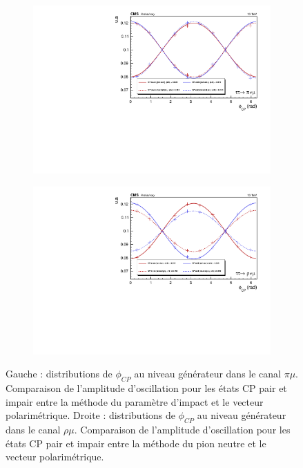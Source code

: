 \begin{figure}
  \begin{subfigure}[b]{0.5\linewidth}
    \centering
    \includegraphics[width=\linewidth]{Chapitre6/Images/PIMU/pimu_pvdpgen.pdf} 
    \caption*{} 
    \vspace{0.5ex}
  \end{subfigure}%
  \begin{subfigure}[b]{0.5\linewidth}
    \centering
    \includegraphics[width=\linewidth]{Chapitre6/Images/RHOMU/rhomu_pvdpgen.pdf} 
    \caption*{} 
    \vspace{0.5ex}
  \end{subfigure} 
\caption{Gauche : distributions de $\phi_{CP}$ au niveau générateur dans le canal $\pi\mu$. Comparaison de l'amplitude d'oscillation pour les états CP pair et impair entre la méthode du paramètre d'impact et le vecteur polarimétrique. Droite : distributions de $\phi_{CP}$ au niveau générateur dans le canal $\rho\mu$. Comparaison de l'amplitude d'oscillation pour les états CP pair et impair entre la méthode du pion neutre et le vecteur polarimétrique.}
\label{Xmugen}
\end{figure}



